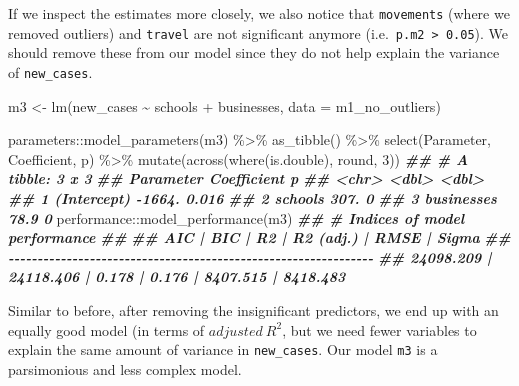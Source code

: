 \documentclass[
]{book}
\newenvironment{Shaded}{\begin{snugshade}}{\end{snugshade}}
\newcommand{\AttributeTok}[1]{\textcolor[rgb]{0.77,0.63,0.00}{#1}}
\newcommand{\DecValTok}[1]{\textcolor[rgb]{0.00,0.00,0.81}{#1}}
\newcommand{\DocumentationTok}[1]{\textcolor[rgb]{0.56,0.35,0.01}{\textbf{\textit{#1}}}}
\newcommand{\FunctionTok}[1]{\textcolor[rgb]{0.00,0.00,0.00}{#1}}
\newcommand{\NormalTok}[1]{#1}
\newcommand{\OtherTok}[1]{\textcolor[rgb]{0.56,0.35,0.01}{#1}}
\newcommand{\SpecialCharTok}[1]{\textcolor[rgb]{0.00,0.00,0.00}{#1}}
\begin{document}
If we inspect the estimates more closely, we also notice that \texttt{movements} (where we removed outliers) and \texttt{travel} are not significant anymore (i.e.~\texttt{p.m2\ \textgreater{}\ 0.05}). We should remove these from our model since they do not help explain the variance of \texttt{new\_cases}.

\begin{Shaded}
\begin{Highlighting}[]
\NormalTok{m3 }\OtherTok{\textless{}{-}} \FunctionTok{lm}\NormalTok{(new\_cases }\SpecialCharTok{\textasciitilde{}}\NormalTok{ schools }\SpecialCharTok{+}\NormalTok{ businesses,}
         \AttributeTok{data =}\NormalTok{ m1\_no\_outliers)}

\NormalTok{parameters}\SpecialCharTok{::}\FunctionTok{model\_parameters}\NormalTok{(m3) }\SpecialCharTok{\%\textgreater{}\%}
  \FunctionTok{as\_tibble}\NormalTok{() }\SpecialCharTok{\%\textgreater{}\%}
  \FunctionTok{select}\NormalTok{(Parameter, Coefficient, p) }\SpecialCharTok{\%\textgreater{}\%} 
  \FunctionTok{mutate}\NormalTok{(}\FunctionTok{across}\NormalTok{(}\FunctionTok{where}\NormalTok{(is.double), round, }\DecValTok{3}\NormalTok{))}
\DocumentationTok{\#\# \# A tibble: 3 x 3}
\DocumentationTok{\#\#   Parameter   Coefficient     p}
\DocumentationTok{\#\#   \textless{}chr\textgreater{}             \textless{}dbl\textgreater{} \textless{}dbl\textgreater{}}
\DocumentationTok{\#\# 1 (Intercept)     {-}1664.  0.016}
\DocumentationTok{\#\# 2 schools           307.  0    }
\DocumentationTok{\#\# 3 businesses         78.9 0}
\NormalTok{performance}\SpecialCharTok{::}\FunctionTok{model\_performance}\NormalTok{(m3)}
\DocumentationTok{\#\# \# Indices of model performance}
\DocumentationTok{\#\# }
\DocumentationTok{\#\# AIC       |       BIC |    R2 | R2 (adj.) |     RMSE |    Sigma}
\DocumentationTok{\#\# {-}{-}{-}{-}{-}{-}{-}{-}{-}{-}{-}{-}{-}{-}{-}{-}{-}{-}{-}{-}{-}{-}{-}{-}{-}{-}{-}{-}{-}{-}{-}{-}{-}{-}{-}{-}{-}{-}{-}{-}{-}{-}{-}{-}{-}{-}{-}{-}{-}{-}{-}{-}{-}{-}{-}{-}{-}{-}{-}{-}{-}{-}{-}}
\DocumentationTok{\#\# 24098.209 | 24118.406 | 0.178 |     0.176 | 8407.515 | 8418.483}
\end{Highlighting}
\end{Shaded}

Similar to before, after removing the insignificant predictors, we end up with an equally good model (in terms of \(adjusted\ R^2\), but we need fewer variables to explain the same amount of variance in \texttt{new\_cases}. Our model \texttt{m3} is a parsimonious and less complex model.
\end{document}
